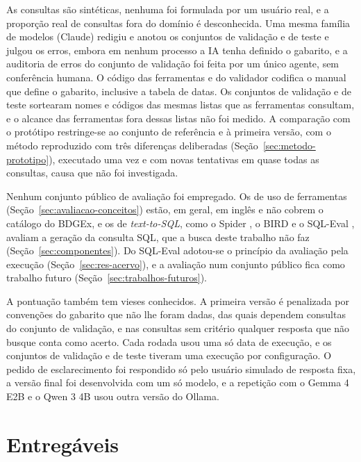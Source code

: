 As consultas são sintéticas, nenhuma foi formulada por um usuário real, e a proporção real de consultas fora do domínio é desconhecida. Uma mesma família de modelos (Claude) redigiu e anotou os conjuntos de validação e de teste e julgou os erros, embora em nenhum processo a IA tenha definido o gabarito, e a auditoria de  erros do conjunto de validação foi feita por um único agente, sem conferência humana. O código das ferramentas e do validador codifica o manual que define o gabarito, inclusive a tabela de datas. Os conjuntos de validação e de teste sortearam nomes e códigos das mesmas listas que as ferramentas consultam, e o alcance das ferramentas fora dessas listas não foi medido. A comparação com o protótipo restringe-se ao conjunto de referência e à primeira versão, com o método reproduzido com três diferenças deliberadas (Seção~\ref{sec:metodo-prototipo}), executado uma vez e com novas tentativas em quase todas as consultas, causa que não foi investigada.

Nenhum conjunto público de avaliação foi empregado. Os de uso de ferramentas (Seção~\ref{sec:avaliacao-conceitos}) estão, em geral, em inglês e não cobrem o catálogo do BDGEx, e os de \textit{text-to-SQL}, como o Spider \cite{yu2018spider}, o BIRD \cite{li2023bird} e o SQL-Eval \cite{defog2023sqleval}, avaliam a geração da consulta SQL, que a busca deste trabalho não faz (Seção~\ref{sec:componentes}). Do SQL-Eval adotou-se o princípio da avaliação pela execução (Seção~\ref{sec:res-acervo}), e a avaliação num conjunto público fica como trabalho futuro (Seção~\ref{sec:trabalhos-futuros}).

A pontuação também tem vieses conhecidos. A primeira versão é penalizada por convenções do gabarito que não lhe foram dadas, das quais dependem  consultas do conjunto de validação, e nas consultas sem critério qualquer resposta que não busque conta como acerto. Cada rodada usou uma só data de execução, e os conjuntos de validação e de teste tiveram uma execução por configuração. O pedido de esclarecimento foi respondido só pelo usuário simulado de resposta fixa, a versão final foi desenvolvida com um só modelo, e a repetição com o Gemma 4 E2B e o Qwen 3 4B usou outra versão do Ollama.

\section{Entregáveis}
\label{sec:entregaveis}

